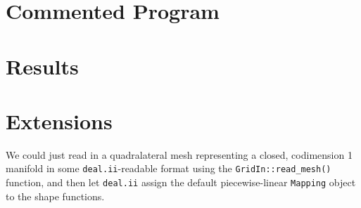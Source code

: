 \documentclass[10pt]{article}
\begin{document}
\section*{Commented Program}

\section*{Results}

\section*{Extensions}
We could just read in a quadralateral mesh representing a closed, codimension 1
manifold in some \texttt{deal.ii}-readable format using the
\texttt{GridIn::read\_mesh()} function, and then let \texttt{deal.ii} assign
the default piecewise-linear \texttt{Mapping} object to the shape functions.  
\end{document}
